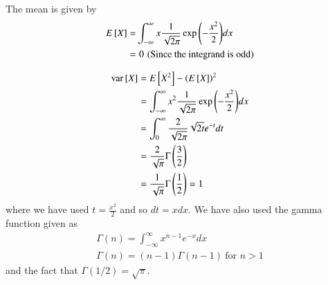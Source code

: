 \documentclass[journal,12pt,twocolumn]{IEEEtran}
\renewcommand\thesection{\arabic{section}}
\begin{document}
\begin{enumerate}[label=\thesection.\arabic*
,ref=\thesection.\theenumi]
\solution
The mean is given by
		\begin{align}
			E{}\left[X\right] =& \int_{-\infty}^{\infty}x\frac{1}{\sqrt{2\pi}}\exp{\ensuremath{\left(-\frac{x^2}{2}\right)}}dx\\
			=& \,\,0\,\,\text{(Since the integrand is odd)}
		\end{align}

		\begin{align}
			\text{var}{}\left[X\right] &= E{}\left[X^2\right] - \left(E{}\left[X\right]\right)^2 \\
			&= \int_{-\infty}^{\infty}x^2\frac{1}{\sqrt{2\pi}}\exp{\left(-\frac{x^2}{2}\right)}dx \label{eq:int} \\
			&= \int_{0}^{\infty}\frac{2}{\sqrt{2\pi}}\sqrt{2t}e^{-t}dt \\
			&= \frac{2}{\sqrt{\pi}}\Gamma\left(\frac{3}{2}\right) \\
			&= \frac{1}{\sqrt{\pi}}\Gamma\left(\frac{1}{2}\right) = 1
			\label{eq:gau-var}
		\end{align}
where we have used $t = \frac{x^2}{2}$ and so $dt = xdx$. We have also used the gamma function given as
\begin{align}
	\Gamma(n) = \int_{-\infty}^{\infty}x^{n - 1}e^{-x}dx \\
	\Gamma(n) = (n - 1)\Gamma(n - 1)\ \text{for $n > 1$}
\end{align}
and the fact that $\Gamma(1/2) = \sqrt{\pi}$.

\end{enumerate}
\end{document}
